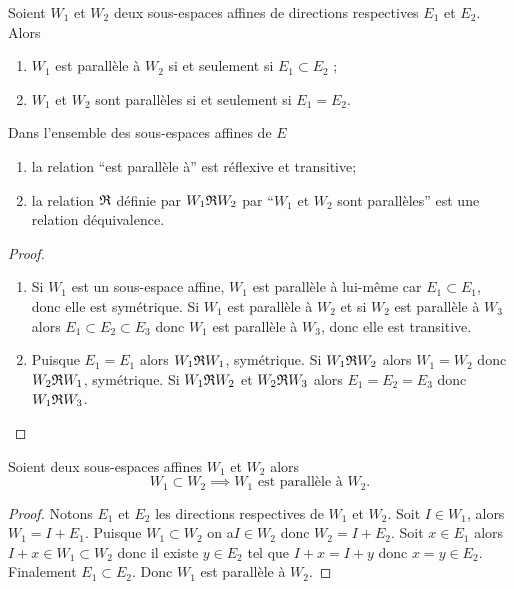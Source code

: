 \begin{defdef}
  Soient $W_1$ et $W_2$ deux sous-espaces affines de directions respectives $E_1$ et $E_2$. Alors
  \begin{enumerate}
  \item $W_1$ est parallèle à $W_2$ si et seulement si $E_1 \subset E_2$ ;
  \item $W_1$ et $W_2$ sont parallèles si et seulement si $E_1=E_2$.
  \end{enumerate}
\end{defdef}
%
\begin{prop}
  Dans l'ensemble des sous-espaces affines de $E$
  \begin{enumerate}
  \item la relation ``est parallèle à'' est réflexive et transitive;
  \item la relation $\mathfrak{R}{}$ définie par $W_1\mathfrak{R}{}W_2$ par ``$W_1$ et $W_2$ sont parallèles'' est une relation déquivalence.
  \end{enumerate}
\end{prop}
\begin{proof}
  \begin{enumerate}
  \item Si $W_1$ est un sous-espace affine, $W_1$ est parallèle à lui-même car $E_1 \subset E_1$, donc elle est symétrique. Si $W_1$ est parallèle à $W_2$ et si $W_2$ est parallèle à $W_3$ alors $E_1 \subset E_2 \subset E_3$ donc $W_1$ est parallèle à $W_3$, donc elle est transitive.
  \item Puisque $E_1=E_1$ alors $W_1\mathfrak{R}{}W_1$, symétrique. Si $W_1 \mathfrak{R}{}W_2$ alors $W_1=W_2$ donc $W_2\mathfrak{R}{}W_1$, symétrique. Si $W_1 \mathfrak{R}{}W_2$ et $W_2\mathfrak{R}{}W_3$ alors $E_1=E_2=E_3$ donc $W_1\mathfrak{R}{}W_3$.
  \end{enumerate}
\end{proof}
%
\begin{prop}
  Soient deux sous-espaces affines $W_1$ et $W_2$ alors
  \begin{equation}
    W_1 \subset W_2 \implies W_1 \text{~est parallèle à } W_2.
  \end{equation}
\end{prop}
\begin{proof}
  Notons $E_1$ et $E_2$ les directions respectives de $W_1$ et $W_2$. Soit $I \in W_1$, alors $W_1 = I+E_1$. Puisque $W_1 \subset W_2$ on a$I \in W_2$ donc $W_2 = I+E_2$. Soit $x \in E_1$ alors $I+x \in W_1 \subset W_2$ donc il existe $y \in E_2$ tel que $I+x=I+y$ donc $x=y \in E_2$. Finalement $E_1 \subset E_2$. Donc $W_1$ est parallèle à $W_2$.
\end{proof}

